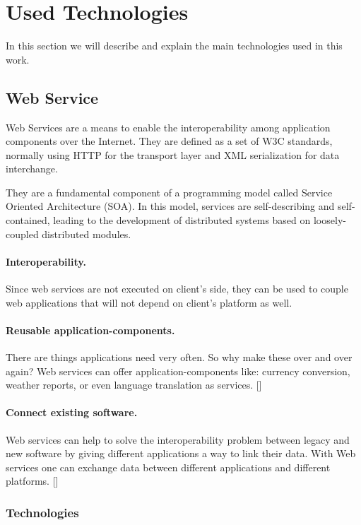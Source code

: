 \section{Used Technologies}
In this section we will describe and explain the main technologies used in this work.

\subsection{Web Service}
Web Services are a means to enable the interoperability among application components over the Internet.  They are defined as a set of W3C standards, normally using HTTP for the transport layer and XML serialization for data interchange.

They are  a fundamental component of a programming model called Service Oriented Architecture (SOA). In this model, services are self-describing and self-contained, leading to the development of distributed systems based on loosely-coupled distributed modules.

\paragraph{Interoperability.}
Since web services are not executed on client's side, they can be used to couple web applications that will not depend on client's platform as well.

\paragraph{Reusable application-components.}
There are things applications need very often. So why make these over and over again? Web services can offer application-components like: currency conversion, weather reports, or even language translation as services.  [\citet{WST}]

\paragraph{Connect existing software.}
Web services can help to solve the interoperability problem between legacy and new software by giving different applications a way to link their data. With Web services one can exchange data between different applications and different platforms. [\citet{WST}]

\subsubsection{Technologies}

